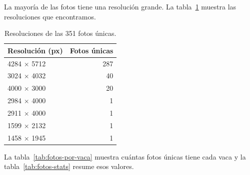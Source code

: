La mayoría de las fotos tiene una resolución grande. La tabla~\ref{tab:resoluciones} muestra las resoluciones que encontramos.

\begin{table}[H]
  \centering
  \caption{Resoluciones de las 351 fotos únicas.}
  \label{tab:resoluciones}
  \begin{tabular}{lr}
    \toprule
    Resolución (px) & Fotos únicas \\
    \midrule
    4284 $\times$ 5712 & 287 \\
    3024 $\times$ 4032 & 40 \\
    4000 $\times$ 3000 & 20 \\
    2984 $\times$ 4000 & 1 \\
    2911 $\times$ 4000 & 1 \\
    1599 $\times$ 2132 & 1 \\
    1458 $\times$ 1945 & 1 \\
    \bottomrule
  \end{tabular}
\end{table}

La tabla~\ref{tab:fotos-por-vaca} muestra cuántas fotos únicas tiene cada vaca y la tabla~\ref{tab:fotos-stats} resume esos valores.

